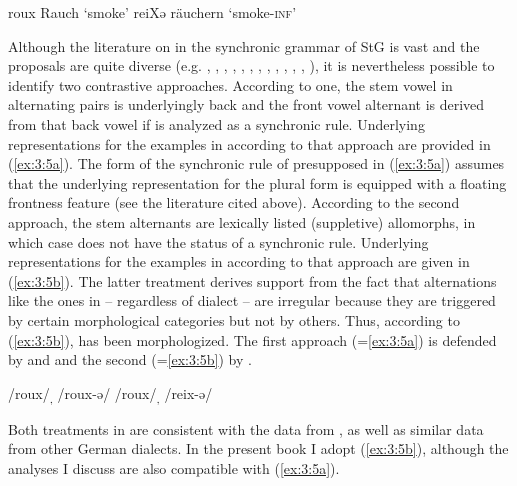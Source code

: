 \ea\label{ex:3:4}
\ea\label{ex:3:4a}roux  \tab [roux]  \tab Rauch    \tab ‘smoke’ 
\ex\label{ex:3:4b}reiXə \tab [reiçə] \tab räuchern \tab ‘smoke-\textsc{inf}’ 
\z 
\z

Although the literature on  in the synchronic grammar of StG is vast and the proposals are quite diverse (e.g. \citealt{Zwicky1967}, \citealt{Vennemann1968}, \citealt{Wurzel1970}, \citealt{BachKing1970}, \citealt{Lieber1980}, \citealt{vanLessenKloeke1982}, \citealt{Strauss1982}, \citealt{Janda1987}, \citealt{Lieber1987}, \citealt{Lodge1989}, \citealt{Klein1995}, \citealt{Wiese1996b, Wiese1996a}, \citealt{Trommer2021}), it is nevertheless possible to identify two contrastive approaches. According to one, the stem vowel in alternating pairs is underlyingly back and the front vowel alternant is derived from that back vowel if  is analyzed as a synchronic rule. Underlying representations for the examples in  according to that approach are provided in (\ref{ex:3:5a}). The form of the synchronic rule of  presupposed in (\ref{ex:3:5a}) assumes that the underlying representation for the plural form is equipped with a floating frontness feature (see the literature cited above). According to the second approach, the stem alternants are lexically listed (suppletive) allomorphs, in which case  does not have the status of a synchronic rule. Underlying representations for the examples in  according to that approach are given in (\ref{ex:3:5b}). The latter treatment derives support from the fact that alternations like the ones in  -- regardless of dialect -- are irregular because they are triggered by certain morphological categories but not by others. Thus, according to (\ref{ex:3:5b}),  has been morphologized. The first approach (=\ref{ex:3:5a}) is defended by \citet{Wiese1996b} and \citet{Trommer2021} and the second (=\ref{ex:3:5b}) by \citet{Booij2010}.

\ea%
    \label{ex:3:5}
\ea\label{ex:3:5a}/roux/\textsubscript{,} /roux-ə/
\ex\label{ex:3:5b}/roux/\textsubscript{,} /reix-ə/
\z 
\z 

Both treatments in  are consistent with the data from , as well as similar data from other German dialects. In the present book I adopt (\ref{ex:3:5b}), although the analyses I discuss are also compatible with (\ref{ex:3:5a}).

